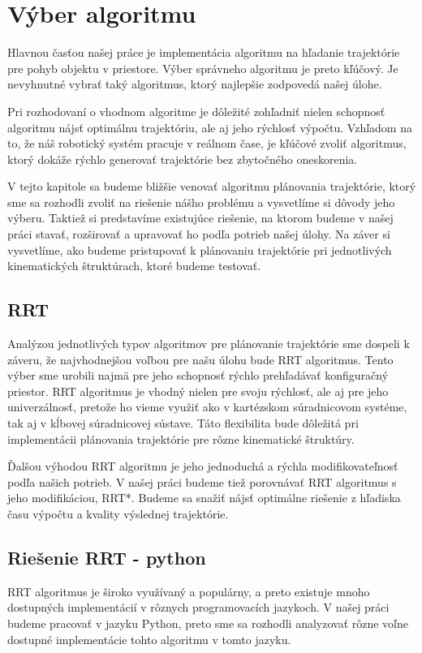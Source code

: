 \section{Výber algoritmu}
\label{kap:3}
Hlavnou časťou našej práce je implementácia algoritmu na hľadanie trajektórie pre pohyb objektu v priestore. Výber správneho algoritmu je preto kľúčový. Je nevyhnutné vybrať taký algoritmus, ktorý najlepšie zodpovedá našej úlohe.

Pri rozhodovaní o vhodnom algoritme je dôležité zohľadniť nielen schopnosť algoritmu nájsť optimálnu trajektóriu, ale aj jeho rýchlosť výpočtu. Vzhľadom na to, že náš robotický systém pracuje v reálnom čase, je kľúčové zvoliť algoritmus, ktorý dokáže rýchlo generovať trajektórie bez zbytočného oneskorenia.

V tejto kapitole sa budeme bližšie venovať algoritmu plánovania trajektórie, ktorý sme sa rozhodli zvoliť na riešenie nášho problému a vysvetlíme si dôvody jeho výberu. Taktiež si predstavíme existujúce riešenie, na ktorom budeme v našej práci stavať, rozširovať a upravovať ho podľa potrieb našej úlohy. Na záver si vysvetlíme, ako budeme pristupovať k plánovaniu trajektórie pri jednotlivých kinematických štruktúrach, ktoré budeme testovať.

\subsection{RRT}

Analýzou jednotlivých typov algoritmov pre plánovanie trajektórie sme dospeli k záveru, že najvhodnejšou voľbou pre našu úlohu bude RRT algoritmus. 
Tento výber sme urobili najmä pre jeho schopnosť rýchlo prehľadávať konfiguračný priestor. RRT algoritmus je vhodný nielen pre svoju rýchlosť, ale aj pre jeho univerzálnosť, pretože ho vieme využiť ako v kartézskom súradnicovom systéme, tak aj v kĺbovej súradnicovej sústave. Táto flexibilita bude dôležitá pri implementácii plánovania trajektórie pre rôzne kinematické štruktúry.

Ďalšou výhodou RRT algoritmu je jeho jednoduchá a rýchla modifikovateľnosť podľa našich potrieb. V našej práci budeme tiež porovnávať RRT algoritmus s jeho modifikáciou, RRT*. Budeme sa snažiť nájsť optimálne riešenie z hľadiska času výpočtu a kvality výslednej trajektórie.


\subsection{Riešenie RRT - python}
RRT algoritmus je široko využívaný a populárny, a preto existuje mnoho dostupných implementácií v rôznych programovacích jazykoch. V našej práci budeme pracovať v jazyku Python, preto sme sa rozhodli analyzovať rôzne voľne dostupné implementácie tohto algoritmu v tomto jazyku.

